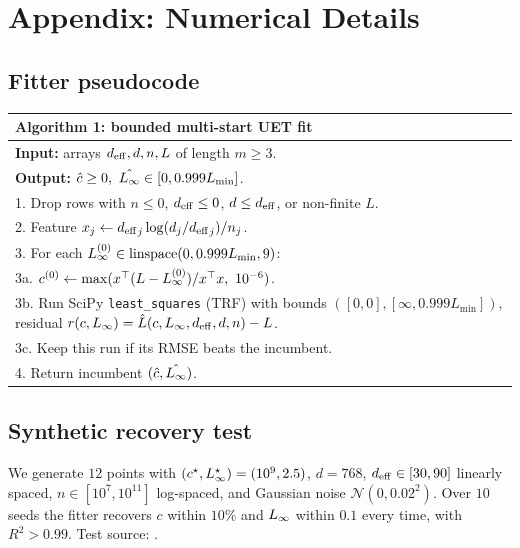 \appendix
\section{Appendix: Numerical Details}

\subsection{Fitter pseudocode}
\label{sec:appendix-synth}

\begin{center}\small
\begin{tabular}{p{}}
\toprule
\textbf{Algorithm 1: bounded multi-start UET fit} \\
\midrule
\textbf{Input:} arrays $d_{\mathrm{eff}}, d, n, L$ of length $m \geq 3$. \\
\textbf{Output:} $\hat c \geq 0,\ \hat {L_{\infty}} \in [0, 0.999 L_{\min}]$. \\
1. Drop rows with $n \leq 0$, $d_{\mathrm{eff}} \leq 0$, $d \leq d_{\mathrm{eff}}$, or non-finite $L$. \\
2. Feature $x_j \leftarrow {d_{\mathrm{eff}}}_j \log(d_j/{d_{\mathrm{eff}}}_j) / n_j$. \\
3. For each $L_{\infty}^{(0)} \in \mathrm{linspace}(0, 0.999 L_{\min}, 9)$:\\
\quad 3a. $c^{(0)} \leftarrow \max(x^\top (L-\Linf^{(0)}) / x^\top x,\ 10^{-6})$. \\
\quad 3b. Run SciPy \texttt{least\_squares} (TRF) with bounds
         $([0,0], [\infty, 0.999 L_{\min}])$, residual
         $r(c,L_{\infty}) = \hat L(c,L_{\infty},d_{\mathrm{eff}},d,n) - L$. \\
\quad 3c. Keep this run if its RMSE beats the incumbent. \\
4. Return incumbent $(\hat c, \hat {L_{\infty}})$. \\
\bottomrule
\end{tabular}
\end{center}

\subsection{Synthetic recovery test}

We generate $12$ points with $(c^\star, L_{\infty}^\star) = (10^{9}, 2.5)$,
$d = 768$, $d_{\mathrm{eff}} \in [30, 90]$ linearly spaced, $n \in [10^{7}, 10^{11}]$
log-spaced, and Gaussian noise $\mathcal{N}(0, 0.02^2)$. Over $10$
seeds the fitter recovers $c$ within $10\%$ and $L_{\infty}$ within
$0.1$ every time, with $R^2 > 0.99$. Test source:
.

